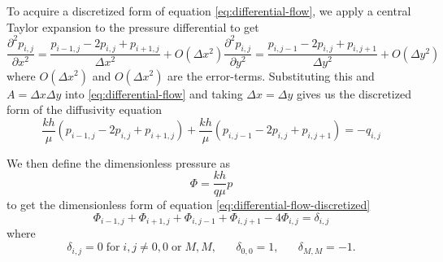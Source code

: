 To acquire a discretized form of equation \eqref{eq:differential-flow}, we apply a central Taylor expansion to the pressure differential to get
\begin{subequations}
    \begin{equation}
        \frac{\partial^2 p_{i,j}}{\partial x^2} = \frac{p_{i-1,j} -2p_{i,j} + p_{i+1,j}}{\Delta x^2} + O(\Delta x^2)
    \end{equation}
    \begin{equation}
        \frac{\partial^2 p_{i,j}}{\partial y^2} = \frac{p_{i,j-1} -2p_{i,j} + p_{i,j+1}}{\Delta y^2} + O(\Delta y^2)
    \end{equation}
\end{subequations}
where $O(\Delta x^2)$ and $O(\Delta x^2)$ are the error-terms. Substituting this and $A=\Delta x \Delta y$ into \eqref{eq:differential-flow} and taking $\Delta x = \Delta y$ gives us the discretized form of the diffusivity equation
\begin{equation}
    \label{eq:differential-flow-discretized}
    \frac{kh}{\mu} \left( p_{i-1,j} -2p_{i,j} + p_{i+1,j} \right) + \frac{kh}{\mu} \left( p_{i,j-1} -2p_{i,j} + p_{i,j+1} \right) = -q_{i,j}
\end{equation}

We then define the dimensionless pressure as
\begin{equation}
    \label{eq:dimensionless-pressure}
    \Phi = \frac{kh}{q\mu} p
\end{equation}
to get the dimensionless form of equation \eqref{eq:differential-flow-discretized} \cite{Peaceman1978Interpretation}
\begin{equation}
    \label{eq:differential-flow-discretzed-dimensionless}
     \Phi_{i-1,j} + \Phi_{i+1,j} + \Phi_{i,j-1}  + \Phi_{i,j+1} -4 \Phi_{i,j}  = \delta_{i,j}
\end{equation}
where
\begin{equation}
    \delta_{i,j} = 0 \;\mathrm{for}\; i,j \neq 0,0 \;\mathrm{or}\; M,M, \;\;\;\;\;\;
    \delta_{0,0} = 1, \;\;\;\;\;\;
    \delta_{M,M} = -1.
\end{equation}

